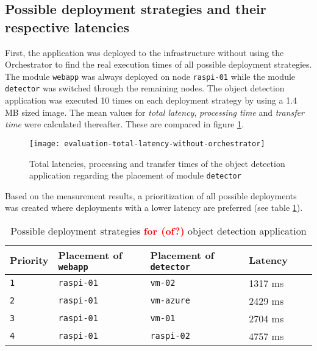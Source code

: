 \subsection*{Possible deployment strategies and their respective latencies}
First, the application was deployed to the infrastructure without using the Orchestrator to find the real execution times of all possible deployment strategies. The module \texttt{webapp} was always deployed on node \texttt{raspi-01} while the module \texttt{detector} was switched through the remaining nodes. The object detection application was executed 10 times on each deployment strategy by using a 1.4 MB sized image. The mean values for \textit{total latency}, \textit{processing time} and \textit{transfer time} were calculated thereafter. These are compared in figure \ref{fig:evaluation-total-latency-without-orchestrator}.

\begin{figure}[h!]
    \centering
    \texttt{[image: evaluation-total-latency-without-orchestrator]}
    \caption{Total latencies, processing and transfer times of the object detection application regarding the placement of module \texttt{detector}}
    \label{fig:evaluation-total-latency-without-orchestrator}
\end{figure}

Based on the measurement results, a prioritization of all possible deployments was created where deployments with a lower latency are preferred (see table \ref{tab:deployment-strategies-prios}).
\begin{table}[h!tb]
    \centering
    \begin{tabular}{|l|l|l|l|l|l|}
    \hline
        \textbf{Priority} & \textbf{Placement of \texttt{webapp}} & \textbf{Placement of \texttt{detector}} & \textbf{Latency} \\
         \hline
         \texttt{1} & \texttt{raspi-01} & \texttt{vm-02} & 1317 ms\\
         \hline
         \texttt{2} & \texttt{raspi-01} & \texttt{vm-azure} & 2429 ms\\
         \hline
         \texttt{3} & \texttt{raspi-01} & \texttt{vm-01} & 2704 ms\\
         \hline
         \texttt{4} & \texttt{raspi-01} & \texttt{raspi-02} & 4757 ms\\
         \hline
    \end{tabular}
    \caption{Possible deployment strategies \textcolor{red}{\textbf{for (of?)}} object detection application}
    \label{tab:deployment-strategies-prios}
\end{table}

